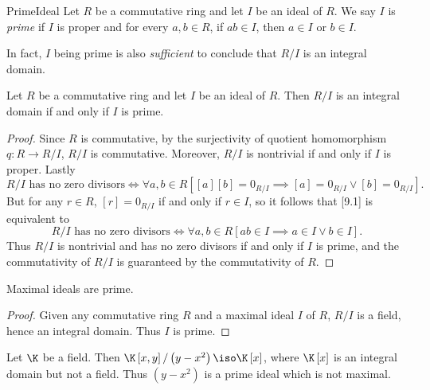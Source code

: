 \documentclass[pmath347]{subfiles}
\begin{document}
    \begin{definition}{Prime}{Ideal}
        Let $R$ be a commutative ring and let $I$ be an ideal of $R$. We say $I$ is \emph{prime} if $I$ is proper and for every $a,b\in R$, if $ab\in I$, then $a\in I$ or $b\in I$.
    \end{definition}

    \noindent In fact, $I$ being prime is also \textit{sufficient} to conclude that $R /I$ is an integral domain.

    \begin{theorem}{}
        Let $R$ be a commutative ring and let $I$ be an ideal of $R$. Then $R /I$ is an integral domain if and only if $I$ is prime.
    \end{theorem}

    \begin{proof}
        Since $R$ is commutative, by the surjectivity of quotient homomorphism $q:R\to R /I$, $R /I$ is commutative. Moreover, $R /I$ is nontrivial if and only if $I$ is proper. Lastly 
        \begin{equation}
            R /I \text{ has no zero divisors} \iff \forall a,b\in R\left[ \left[ a \right] \left[ b \right] = 0_{R /I}\implies \left[ a \right] = 0_{R /I}\lor \left[ b \right] = 0_{R /I} \right] .
        \end{equation}
        But for any $r\in R$, $\left[ r \right] = 0_{R /I}$ if and only if $r\in I$, so it follows that [9.1] is equivalent to
        \begin{equation*}
            R /I\text{ has no zero divisors} \iff \forall a,b\in R \left[ ab\in I\implies a\in I\lor b\in I \right] .
        \end{equation*}
        Thus $R /I$ is nontrivial and has no zero divisors if and only if $I$ is prime, and the commutativity of $R /I$ is guaranteed by the commutativity of $R$.
    \end{proof}

    \begin{cor}{}
        Maximal ideals are prime.
    \end{cor}	

    \begin{proof}
        Given any commutative ring $R$ and a maximal ideal $I$ of $R$, $R /I$ is a field, hence an integral domain. Thus $I$ is prime.
    \end{proof}

    \ex Let $\K$ be a field. Then $\K\left[ x,y \right] / \left( y-x^{2}  \right)\iso\K\left[ x \right]$, where $\K\left[ x \right]$ is an integral domain but not a field. Thus $\left( y-x^{2}  \right)$ is a prime ideal which is not maximal.
\end{document}
